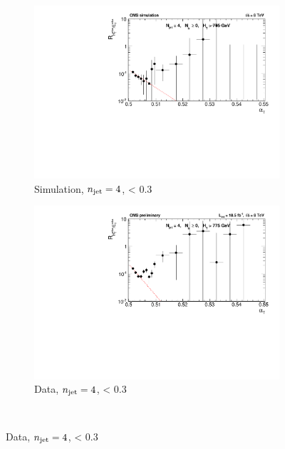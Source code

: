 \begin{figure}[p!]
    \begin{subfigure}[b]{0.46\textwidth}
      \includegraphics[width=\textwidth]{Figs/dphi/chris2/qcd_mc/dphi_lt0p3/v2/ratio_eq4j_ge0b_775}
      \caption{Simulation, $n_{\text{jet}} = 4$, \mindphistar < 0.3}
      \label{fig:rdphi_sim_j4_lt0p3}
    \end{subfigure}
    \begin{subfigure}[b]{0.46\textwidth}
      \includegraphics[width=\textwidth]{Figs/dphi/chris2/data/dphi_lt0p3/v2/ratio_eq4j_ge0b_775}
      \caption{Data, $n_{\text{jet}} = 4$, \mindphistar < 0.3}
      \label{fig:rdphi_data_j4_lt0p3}
    \end{subfigure} \\


\end{figure}
